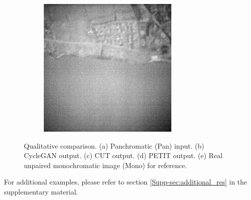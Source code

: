 \begin{figure}
\begin{subfigure}[b]{0.19\textwidth}
        \label{fig:petit}
    \end{subfigure}
    \hfill
    \begin{subfigure}[b]{0.19\textwidth}
        \centering
        \includegraphics[width=\textwidth]{../figs/outputs/mono/994.png}
        \label{fig:mono}
    \end{subfigure}

    \caption{Qualitative comparison. (a) Panchromatic (Pan) input. (b) CycleGAN output. (c) CUT output. (d) PETIT output. (e) Real unpaired monochromatic image (Mono) for reference.}
    \label{fig:qual_comp}
\end{figure}
For additional examples, please refer to section \ref{Supp-sec:additional_res} in the supplementary material.